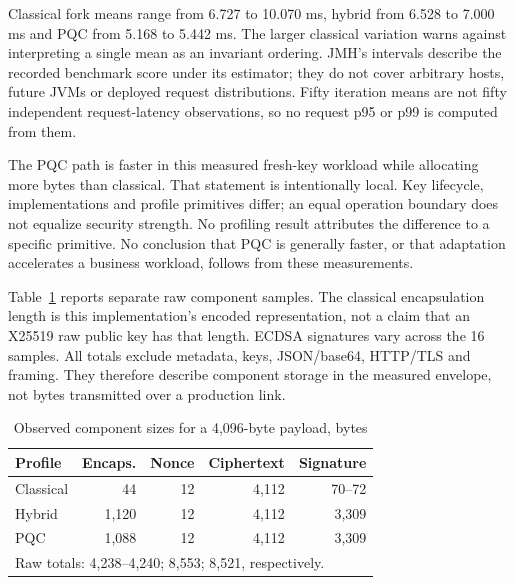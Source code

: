 \documentclass[conference,a4paper]{IEEEtran}
\begin{document}
Classical fork means range from 6.727 to 10.070 ms, hybrid from 6.528 to 7.000 ms and PQC from 5.168 to 5.442 ms. The larger classical variation warns against interpreting a single mean as an invariant ordering. JMH's intervals describe the recorded benchmark score under its estimator; they do not cover arbitrary hosts, future JVMs or deployed request distributions. Fifty iteration means are not fifty independent request-latency observations, so no request p95 or p99 is computed from them.

The PQC path is faster in this measured fresh-key workload while allocating more bytes than classical. That statement is intentionally local. Key lifecycle, implementations and profile primitives differ; an equal operation boundary does not equalize security strength. No profiling result attributes the difference to a specific primitive. No conclusion that PQC is generally faster, or that adaptation accelerates a business workload, follows from these measurements.

Table~\ref{sizes} reports separate raw component samples. The classical encapsulation length is this implementation's encoded representation, not a claim that an X25519 raw public key has that length. ECDSA signatures vary across the 16 samples. All totals exclude metadata, keys, JSON/base64, HTTP/TLS and framing. They therefore describe component storage in the measured envelope, not bytes transmitted over a production link.

\begin{table}[t]
\caption{Observed component sizes for a 4,096-byte payload, bytes}
\label{sizes}\centering\footnotesize
\begin{tabular}{|l|r|r|r|r|}\hline
Profile & Encaps. & Nonce & Ciphertext & Signature\\\hline
Classical &44&12&4,112&70--72\\\hline
Hybrid &1,120&12&4,112&3,309\\\hline
PQC &1,088&12&4,112&3,309\\\hline
\multicolumn{5}{|l|}{Raw totals: 4,238--4,240; 8,553; 8,521, respectively.}\\\hline
\end{tabular}
\end{table}
\end{document}
